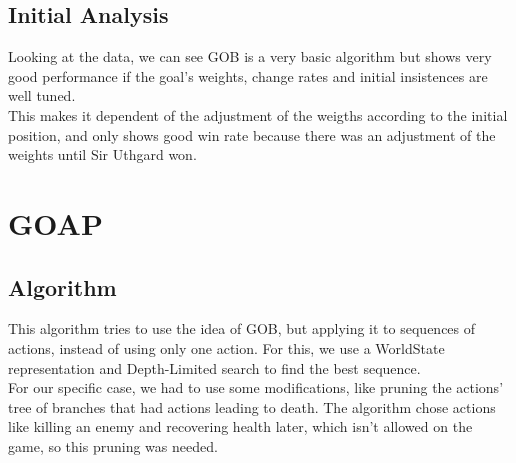 \documentclass{article}
\begin{document}
  \subsection{Initial Analysis}
  Looking at the data, we can see GOB is a very basic algorithm but shows very good performance if the goal's weights, change rates and initial insistences are well tuned.\\
  This makes it dependent of the adjustment of the weigths according to the initial position, and only shows good win rate because there was an adjustment of the weights
  until Sir Uthgard won. 
  \section{GOAP}
  \subsection{Algorithm}
  This algorithm tries to use the idea of GOB, but applying it to sequences of actions, instead of using only one action. For this, we use a WorldState representation 
  and Depth-Limited search to find the best sequence.\\
  For our specific case, we had to use some modifications, like pruning the actions' tree of branches that had actions leading to death. The algorithm chose actions like killing
  an enemy and recovering health later, which isn't allowed on the game, so this pruning was needed.
\end{document}
